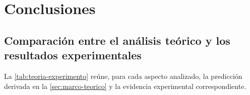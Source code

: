 \section{Conclusiones}
\label{sec:conclusiones}

\subsection{Comparación entre el análisis teórico y los resultados experimentales}
\label{sec:concl-teoria-experimento}
La \cref{tab:teoria-experimento} reúne, para cada aspecto analizado, la predicción derivada en
la \cref{sec:marco-teorico} y la evidencia experimental correspondiente.

